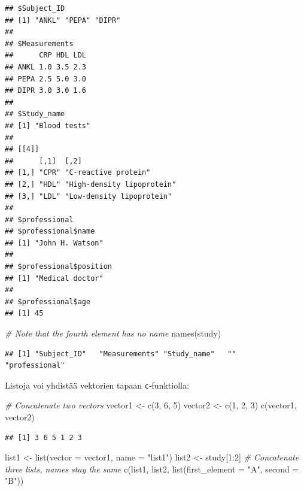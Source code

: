 \documentclass[
]{book}
\newenvironment{Shaded}{\begin{snugshade}}{\end{snugshade}}
\newcommand{\AttributeTok}[1]{\textcolor[rgb]{0.77,0.63,0.00}{#1}}
\newcommand{\CommentTok}[1]{\textcolor[rgb]{0.56,0.35,0.01}{\textit{#1}}}
\newcommand{\DecValTok}[1]{\textcolor[rgb]{0.00,0.00,0.81}{#1}}
\newcommand{\FunctionTok}[1]{\textcolor[rgb]{0.00,0.00,0.00}{#1}}
\newcommand{\NormalTok}[1]{#1}
\newcommand{\OtherTok}[1]{\textcolor[rgb]{0.56,0.35,0.01}{#1}}
\newcommand{\SpecialCharTok}[1]{\textcolor[rgb]{0.00,0.00,0.00}{#1}}
\newcommand{\StringTok}[1]{\textcolor[rgb]{0.31,0.60,0.02}{#1}}
\begin{document}
\begin{verbatim}
## $Subject_ID
## [1] "ANKL" "PEPA" "DIPR"
## 
## $Measurements
##      CRP HDL LDL
## ANKL 1.0 3.5 2.3
## PEPA 2.5 5.0 3.0
## DIPR 3.0 3.0 1.6
## 
## $Study_name
## [1] "Blood tests"
## 
## [[4]]
##      [,1]  [,2]                      
## [1,] "CPR" "C-reactive protein"      
## [2,] "HDL" "High-density lipoprotein"
## [3,] "LDL" "Low-density lipoprotein" 
## 
## $professional
## $professional$name
## [1] "John H. Watson"
## 
## $professional$position
## [1] "Medical doctor"
## 
## $professional$age
## [1] 45
\end{verbatim}

\begin{Shaded}
\begin{Highlighting}[]
\CommentTok{\# Note that the fourth element has no name}
\FunctionTok{names}\NormalTok{(study)}
\end{Highlighting}
\end{Shaded}

\begin{verbatim}
## [1] "Subject_ID"   "Measurements" "Study_name"   ""             "professional"
\end{verbatim}

Listoja voi yhdistää vektorien tapaan \texttt{c}-funktiolla:

\begin{Shaded}
\begin{Highlighting}[]
\CommentTok{\# Concatenate two vectors}
\NormalTok{vector1 }\OtherTok{\textless{}{-}} \FunctionTok{c}\NormalTok{(}\DecValTok{3}\NormalTok{, }\DecValTok{6}\NormalTok{, }\DecValTok{5}\NormalTok{)}
\NormalTok{vector2 }\OtherTok{\textless{}{-}} \FunctionTok{c}\NormalTok{(}\DecValTok{1}\NormalTok{, }\DecValTok{2}\NormalTok{, }\DecValTok{3}\NormalTok{)}
\FunctionTok{c}\NormalTok{(vector1, vector2)}
\end{Highlighting}
\end{Shaded}

\begin{verbatim}
## [1] 3 6 5 1 2 3
\end{verbatim}

\begin{Shaded}
\begin{Highlighting}[]
\NormalTok{list1 }\OtherTok{\textless{}{-}} \FunctionTok{list}\NormalTok{(}\AttributeTok{vector =}\NormalTok{ vector1,}
              \AttributeTok{name =} \StringTok{"list1"}\NormalTok{)}
\NormalTok{list2 }\OtherTok{\textless{}{-}}\NormalTok{ study[}\DecValTok{1}\SpecialCharTok{:}\DecValTok{2}\NormalTok{]}
\CommentTok{\# Concatenate three lists, names stay the same}
\FunctionTok{c}\NormalTok{(list1, list2, }\FunctionTok{list}\NormalTok{(}\AttributeTok{first\_element =} \StringTok{"A"}\NormalTok{, }\AttributeTok{second =} \StringTok{"B"}\NormalTok{))}
\end{Highlighting}
\end{Shaded}
\end{document}
